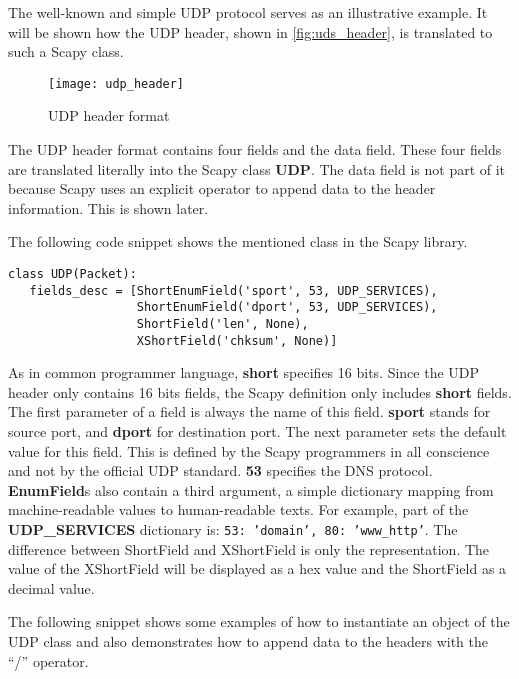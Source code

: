 The well-known and simple UDP protocol \cite{rfc768} serves as an illustrative example. It will be shown how the UDP header, shown in \autoref{fig:uds_header}, is translated to such a Scapy class.

\begin{figure}[h]
    \centering
    \texttt{[image: udp\_header]}
    \caption{UDP header format \cite{udp_header}}
    \label{fig:uds_header}
\end{figure}

The UDP header format contains four fields and the data field. These four fields are translated literally into the Scapy class \textbf{UDP}. The data field is not part of it because Scapy uses an explicit operator to append data to the header information. This is shown later.

The following code snippet shows the mentioned class in the Scapy library.

\begin{samepage}
\begin{verbatim}
class UDP(Packet):
   fields_desc = [ShortEnumField('sport', 53, UDP_SERVICES),
                  ShortEnumField('dport', 53, UDP_SERVICES),
                  ShortField('len', None),
                  XShortField('chksum', None)]
\end{verbatim}
\end{samepage}

As in common programmer language, \textbf{short} specifies 16 bits. Since the UDP header only contains 16 bits fields, the Scapy definition only includes \textbf{short} fields. The first parameter of a field is always the name of this field. \textbf{sport} stands for source port, and \textbf{dport} for destination port.
The next parameter sets the default value for this field. This is defined by the Scapy programmers in all conscience and not by the official UDP standard. \textbf{53} specifies the DNS protocol.
\textbf{EnumField}s also contain a third argument, a simple dictionary mapping from machine-readable values to human-readable texts. For example, part of the \textbf{UDP\_SERVICES} dictionary is: \texttt{{53: 'domain', 80: 'www_http'}}.
The difference between ShortField and XShortField is only the representation. The value of the XShortField will be displayed as a hex value and the ShortField as a decimal value.

The following snippet shows some examples of how to instantiate an object of the UDP class and also demonstrates how to append data to the headers with the “/” operator.

